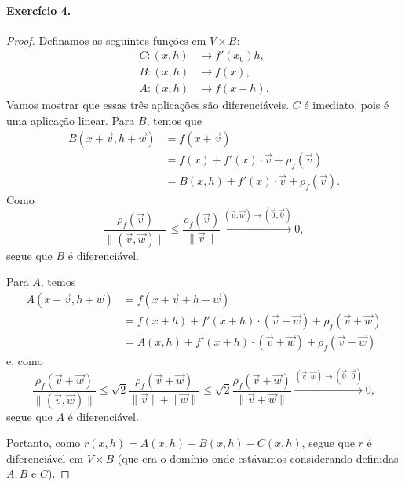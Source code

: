 \documentclass[12pt,a4paper]{article}
\begin{document}
\paragraph{Exercício 4.}
    \begin{proof}
        Definamos as seguintes funções em $V\times B$:
        \begin{align*}
            C: (x,h) &\to f'(x_0)h, \\
            B: (x,h) &\to f(x), \\
            A: (x,h) &\to f(x + h). 
        \end{align*}
        Vamos mostrar que essas três aplicações são diferenciáveis. $C$ é imediato, pois é uma aplicação
        linear. Para $B$, temos que
        \begin{align*}
            B(x+\vec{v}, h+\vec{w}) &= f(x+\vec{v}) \\
                                    &= f(x) + f'(x)\cdot\vec{v} + \rho_f(\vec{v}) \\
                                    &= B(x,h) + f'(x)\cdot\vec{v} + \rho_f(\vec{v}).
        \end{align*}
        Como
        \begin{equation*}
            \frac{\rho_f(\vec{v})}{\|(\vec{v}, \vec{w})\|} 
            \leq \frac{\rho_f(\vec{v})}{\|\vec{v}\|} \xrightarrow{(\vec{v}, \vec{w}) \to (\vec{0},\vec{0})} 0,
        \end{equation*}
        segue que $B$ é diferenciável.
        
        Para $A$, temos
        \begin{align*}
            A(x+\vec{v}, h+\vec{w}) &= f(x+\vec{v} + h+\vec{w}) \\
                                    &= f(x+h) + f'(x+h)\cdot (\vec{v}+\vec{w}) + \rho_f(\vec{v}+\vec{w}) \\
                                    &= A(x,h) + f'(x+h)\cdot (\vec{v}+\vec{w}) + \rho_f(\vec{v}+\vec{w})
        \end{align*}
        e, como
        \begin{equation*}
            \frac{\rho_f(\vec{v}+\vec{w})}{\|(\vec{v}, \vec{w})\|} 
            \leq \sqrt{2}\frac{\rho_f(\vec{v}+\vec{w})}{\|\vec{v}\|+\|\vec{w}\|}
            \leq \sqrt{2}\frac{\rho_f(\vec{v}+\vec{w})}{\|\vec{v}+\vec{w}\|}
            \xrightarrow{(\vec{v}, \vec{w}) \to (\vec{0},\vec{0})} 0,
        \end{equation*}
        segue que $A$ é diferenciável.
        
        Portanto, como $r(x,h) = A(x,h) - B(x,h) - C(x,h)$, segue que $r$ é diferenciável em $V\times B$
        (que era o domínio onde estávamos considerando definidas $A, B$ e $C$).
    \end{proof}
\end{document}
